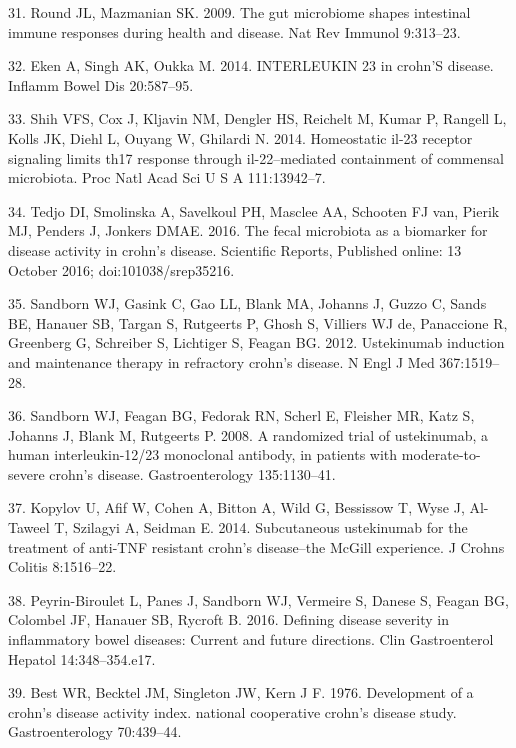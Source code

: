 \documentclass[11pt,]{article}
\begin{document}
\hypertarget{ref-Round_IL23microbiome_2009}{}
31. Round JL, Mazmanian SK. 2009. The gut microbiome shapes intestinal
immune responses during health and disease. Nat Rev Immunol 9:313--23.

\hypertarget{ref-Eken_IL23CD_2014}{}
32. Eken A, Singh AK, Oukka M. 2014. INTERLEUKIN 23 in crohn'S disease.
Inflamm Bowel Dis 20:587--95.

\hypertarget{ref-Shih_IL23Th17_2014}{}
33. Shih VFS, Cox J, Kljavin NM, Dengler HS, Reichelt M, Kumar P,
Rangell L, Kolls JK, Diehl L, Ouyang W, Ghilardi N. 2014. Homeostatic
il-23 receptor signaling limits th17 response through il-22--mediated
containment of commensal microbiota. Proc Natl Acad Sci U S A
111:13942--7.

\hypertarget{ref-tedjo_CDactivity_2016}{}
34. Tedjo DI, Smolinska A, Savelkoul PH, Masclee AA, Schooten FJ van,
Pierik MJ, Penders J, Jonkers DMAE. 2016. The fecal microbiota as a
biomarker for disease activity in crohn's disease. Scientific Reports,
Published online: 13 October 2016; doi:101038/srep35216.

\hypertarget{ref-sandborn_ust_2012}{}
35. Sandborn WJ, Gasink C, Gao LL, Blank MA, Johanns J, Guzzo C, Sands
BE, Hanauer SB, Targan S, Rutgeerts P, Ghosh S, Villiers WJ de,
Panaccione R, Greenberg G, Schreiber S, Lichtiger S, Feagan BG. 2012.
Ustekinumab induction and maintenance therapy in refractory crohn's
disease. N Engl J Med 367:1519--28.

\hypertarget{ref-sandborn_ust_2008}{}
36. Sandborn WJ, Feagan BG, Fedorak RN, Scherl E, Fleisher MR, Katz S,
Johanns J, Blank M, Rutgeerts P. 2008. A randomized trial of
ustekinumab, a human interleukin-12/23 monoclonal antibody, in patients
with moderate-to-severe crohn's disease. Gastroenterology 135:1130--41.

\hypertarget{ref-kopylov_ust_2014}{}
37. Kopylov U, Afif W, Cohen A, Bitton A, Wild G, Bessissow T, Wyse J,
Al-Taweel T, Szilagyi A, Seidman E. 2014. Subcutaneous ustekinumab for
the treatment of anti-TNF resistant crohn's disease--the McGill
experience. J Crohns Colitis 8:1516--22.

\hypertarget{ref-PB_CDAI_2016}{}
38. Peyrin-Biroulet L, Panes J, Sandborn WJ, Vermeire S, Danese S,
Feagan BG, Colombel JF, Hanauer SB, Rycroft B. 2016. Defining disease
severity in inflammatory bowel diseases: Current and future directions.
Clin Gastroenterol Hepatol 14:348--354.e17.

\hypertarget{ref-Best_CDAI_1976}{}
39. Best WR, Becktel JM, Singleton JW, Kern J F. 1976. Development of a
crohn's disease activity index. national cooperative crohn's disease
study. Gastroenterology 70:439--44.
\end{document}
